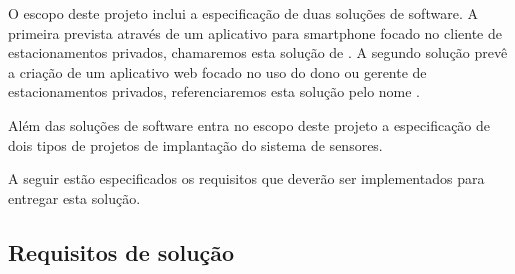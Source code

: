 O escopo deste projeto inclui a especificação de duas soluções de software. A primeira prevista através de um aplicativo para smartphone focado no cliente de estacionamentos privados, chamaremos esta solução de \userMobileAppName. A segundo solução prevê a criação de um aplicativo web focado no uso do dono ou gerente de estacionamentos privados, referenciaremos esta solução pelo nome \parkingWebAppName.

Além das soluções de software entra no escopo deste projeto a especificação de dois tipos de projetos de implantação do sistema de sensores.

A seguir estão especificados os requisitos que deverão ser implementados para entregar esta solução.



\subsection{Requisitos de solução}



